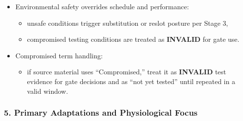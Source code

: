 \documentclass[10pt]{article}
\begin{document}
\begin{itemize}
\item Environmental safety overrides schedule and performance:
  \begin{itemize}
  \item unsafe conditions trigger substitution or reslot posture per Stage 3,
  \item compromised testing conditions are treated as \textbf{INVALID} for gate use.
  \end{itemize}

\item Compromised term handling:
  \begin{itemize}
  \item if source material uses “Compromised,” treat it as \textbf{INVALID} test evidence for gate decisions and as “not yet tested” until repeated in a valid window.
  \end{itemize}
\end{itemize}

\subsubsection*{5. Primary Adaptations and Physiological Focus}
\end{document}
